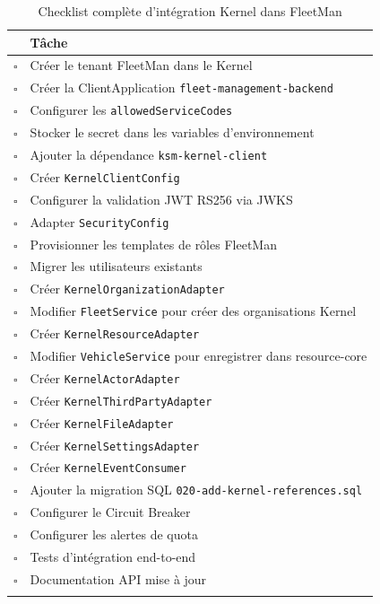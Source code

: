 \documentclass[12pt,a4paper]{report}
\begin{document}
\begin{longtable}{p{0.5cm}p{12cm}}
\toprule
& \textbf{Tâche} \\
\midrule
\endhead
$\square$ & Créer le tenant FleetMan dans le Kernel \\
$\square$ & Créer la ClientApplication \texttt{fleet-management-backend} \\
$\square$ & Configurer les \texttt{allowedServiceCodes} \\
$\square$ & Stocker le secret dans les variables d'environnement \\
$\square$ & Ajouter la dépendance \texttt{ksm-kernel-client} \\
$\square$ & Créer \texttt{KernelClientConfig} \\
$\square$ & Configurer la validation JWT RS256 via JWKS \\
$\square$ & Adapter \texttt{SecurityConfig} \\
$\square$ & Provisionner les templates de rôles FleetMan \\
$\square$ & Migrer les utilisateurs existants \\
$\square$ & Créer \texttt{KernelOrganizationAdapter} \\
$\square$ & Modifier \texttt{FleetService} pour créer des organisations Kernel \\
$\square$ & Créer \texttt{KernelResourceAdapter} \\
$\square$ & Modifier \texttt{VehicleService} pour enregistrer dans resource-core \\
$\square$ & Créer \texttt{KernelActorAdapter} \\
$\square$ & Créer \texttt{KernelThirdPartyAdapter} \\
$\square$ & Créer \texttt{KernelFileAdapter} \\
$\square$ & Créer \texttt{KernelSettingsAdapter} \\
$\square$ & Créer \texttt{KernelEventConsumer} \\
$\square$ & Ajouter la migration SQL \texttt{020-add-kernel-references.sql} \\
$\square$ & Configurer le Circuit Breaker \\
$\square$ & Configurer les alertes de quota \\
$\square$ & Tests d'intégration end-to-end \\
$\square$ & Documentation API mise à jour \\
\bottomrule
\caption{Checklist complète d'intégration Kernel dans FleetMan}
\end{longtable}
\end{document}
